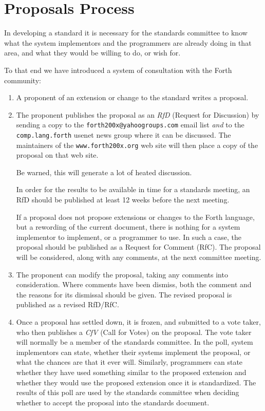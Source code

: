 \chapter*{Proposals Process}
\label{process}

In developing a standard it is necessary for the standards committee to
know what the system implementors and the programmers are already doing
in that area, and what they would be willing to do, or wish for.

To that end we have introduced a system of consultation with the Forth
community:

\begin{enumerate}
\item
	A proponent of an extension or change to the standard writes a
	proposal.

\item
	The proponent publishes the proposal as an \emph{RfD} (Request for
	Discussion) by sending a copy to the \texttt{forth200x@yahoogroups.com}
	email list \emph{and} to the \texttt{comp.lang.forth} usenet news group
	where it can be discussed.  The maintainers of the
	\texttt{www.forth200x.org} web site will then place a copy of the
	proposal on that web site.

	Be warned, this will generate a lot of heated discussion.

	In order for the results to be available in time for a standards
	meeting, an RfD should be published at least 12 weeks before the
	next meeting.

	If a proposal does not propose extensions or changes to the Forth
	language, but a rewording of the current document, there is nothing
	for a system implementor to implement, or a programmer to use.  In
	such a case, the proposal should be published as a Request for Comment
	(RfC). The proposal will be considered, along with any comments, at
	the next committee meeting.

\item
	The proponent can modify the proposal, taking any comments into
	consideration.  Where comments have been dismiss, both the comment
	and the reasons for its dismissal should be given.  The revised
	proposal is published as a revised RfD/RfC.

\item
	Once a proposal has settled down, it is frozen, and submitted to a
	vote taker, who then publishes a \emph{CfV} (Call for Votes) on the
	proposal. The vote taker will normally be a member of the standards
	committee.  In the poll, system implementors can state, whether
	their systems implement the proposal, or what the chances are that
	it ever will.  Similarly, programmers can state whether they have
	used something similar to the proposed extension and whether they
	would use the proposed extension once it is standardized.  The
	results of this poll are used by the standards committee when
	deciding whether to accept the proposal into the standards document.


\end{enumerate}

